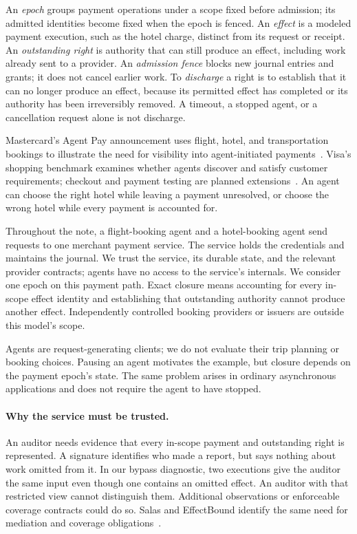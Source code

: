 \documentclass[11pt]{article}
\begin{document}
An \emph{epoch} groups payment operations under a scope fixed before admission;
its admitted identities become fixed when the epoch is fenced. An \emph{effect}
is a modeled payment execution, such as the hotel charge, distinct from its
request or receipt. An \emph{outstanding right} is authority that can still
produce an effect, including work already sent to a provider. An \emph{admission
fence} blocks new journal entries and grants; it does not cancel earlier work.
To \emph{discharge} a right is to establish that it can no longer produce an
effect, because its permitted effect has completed or its authority has been
irreversibly removed. A timeout, a stopped agent, or a cancellation request
alone is not discharge.

Mastercard's Agent Pay announcement uses flight, hotel, and transportation
bookings to illustrate the need for visibility into agent-initiated
payments~\cite{mastercard2026}. Visa's shopping benchmark examines whether
agents discover and satisfy customer requirements; checkout and payment testing
are planned extensions~\cite{visa2026}. An agent can choose the right hotel
while leaving a payment unresolved, or choose the wrong hotel while every
payment is accounted for.

Throughout the note, a flight-booking agent and a hotel-booking agent send
requests to one merchant payment service. The service holds the credentials
and maintains the journal. We trust the service, its durable state, and the
relevant provider contracts; agents have no access to the service's internals.
We consider one epoch on this payment path. Exact closure means accounting for
every in-scope effect identity and establishing that outstanding authority
cannot produce another effect. Independently controlled booking providers or
issuers are outside this model's scope.

Agents are request-generating clients; we do not evaluate their trip planning
or booking choices. Pausing an agent motivates the example, but closure depends
on the payment epoch's state. The same problem arises in ordinary asynchronous
applications and does not require the agent to have stopped.

\paragraph{Why the service must be trusted.}
An auditor needs evidence that every in-scope payment and outstanding right is
represented. A signature identifies who made a report, but says nothing about
work omitted from it. In our bypass diagnostic, two executions give the auditor
the same input even though one contains an omitted effect. An auditor with
that restricted view cannot distinguish them. Additional observations or
enforceable coverage contracts could do so. Salas and EffectBound identify the
same need for mediation and coverage obligations~\cite{salas,effectbound}.
\end{document}
